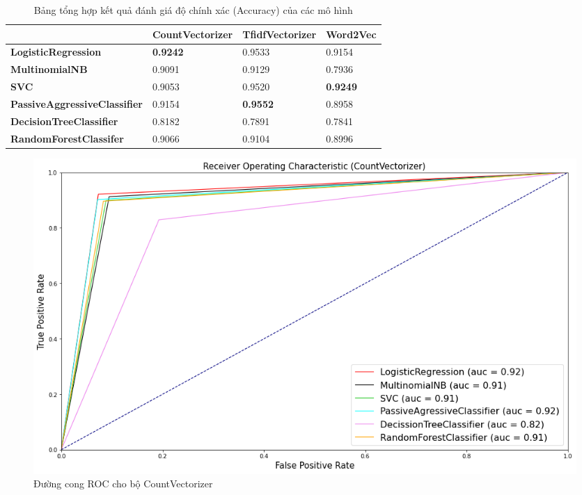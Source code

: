 \documentclass[12pt,a4paper,oneside]{book}
\begin{document}
	\begin{table}[H]
		\renewcommand{\arraystretch}{1.5}
		\small
		\begin{center}
			\begin{tabular}{ | P{12.8em} | P{3.3cm}| P{3cm} | P{2.5cm} |} 
			\hline
		      & \textbf{CountVectorizer} & \textbf{TfidfVectorizer} & \textbf{Word2Vec} \\ 
			\hline
			\textbf{LogisticRegression} & \textbf{0.9242} & 0.9533 & 0.9154\\ 
			\hline
			\textbf{MultinomialNB} & 0.9091 & 0.9129 & 0.7936 \\
			\hline
			\textbf{SVC} & 0.9053 & 0.9520 & \textbf{0.9249} \\
			\hline
			\textbf{PassiveAggressiveClassifier} & 0.9154 & \textbf{0.9552} & 0.8958 \\
			\hline
			\textbf{DecisionTreeClassifier} & 0.8182 & 0.7891 & 0.7841 \\
			\hline
			\textbf{RandomForestClassifer} & 0.9066 & 0.9104 & 0.8996 \\
			\hline
			\end{tabular}
		\end{center}
		\caption{Bảng tổng hợp kết quả đánh giá độ chính xác (Accuracy) của các mô hình}
	\end{table}
	\hfill
	\begin{figure}[H]
		\centering
		\includegraphics[width=1\textwidth]{cvroc}
		\caption{Đường cong ROC cho bộ CountVectorizer}
	\end{figure}
	
\end{document}

